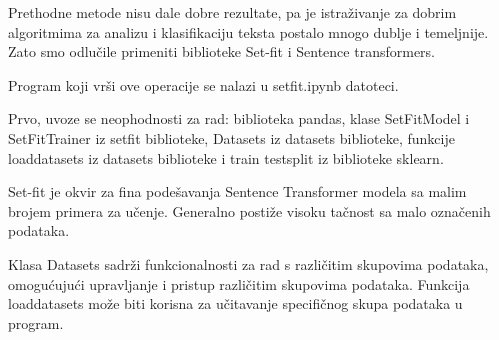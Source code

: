 \documentclass{article}
\begin{document}
\begin{flushleft}
Prethodne metode nisu dale dobre rezultate, pa je istraživanje za dobrim algoritmima za analizu i klasifikaciju teksta postalo mnogo dublje i temeljnije. Zato smo odlučile primeniti biblioteke Set-fit i Sentence transformers.
    \vspace{2mm}

Program koji vrši ove operacije se nalazi u set\textunderscore fit.ipynb 
datoteci.\\ \vspace{2mm}

Prvo, uvoze se neophodnosti za rad: biblioteka pandas, klase SetFitModel i 
SetFitTrainer iz setfit biblioteke, Datasets iz datasets biblioteke, funkcije 
load\textunderscore datasets iz datasets biblioteke i train\textunderscore 
test\textunderscore split iz biblioteke sklearn.\\ \vspace{2mm}


Set-fit je okvir za fina podešavanja Sentence Transformer modela sa malim brojem primera za učenje. Generalno postiže visoku tačnost sa malo označenih podataka. \\ \vspace{2mm}

Klasa Datasets sadrži funkcionalnosti za rad s različitim skupovima podataka, omogućujući upravljanje i pristup različitim skupovima podataka. Funkcija load\textunderscore datasets može biti korisna za učitavanje specifičnog skupa podataka u program. \\ \vspace{2mm}


\end{flushleft}
\end{document}
